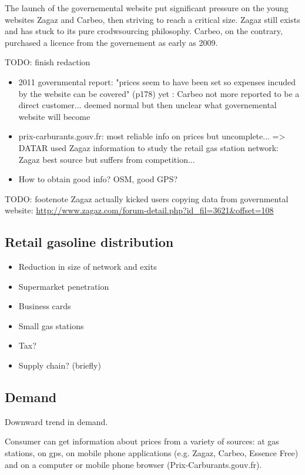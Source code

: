 \documentclass[11pt]{article}
\begin{document}
The launch of the governemental website put significant pressure on the young websites Zagaz and Carbeo, then striving to reach a critical size. Zagaz still exists and has stuck to its pure crodwsourcing philosophy. Carbeo, on the contrary, purchased a licence from the governement as early as 2009.

TODO: finish redaction
\begin{itemize}
\item 2011 governmental report: "prices seem to have been set so expenses incuded by the website can be covered" (p178) yet : Carbeo not more reported to be a direct customer... deemed normal but then unclear what governemental website will become
\item prix-carburants.gouv.fr: most reliable info on prices but uncomplete... => DATAR used Zagaz information to study the retail gas station network: Zagaz best source but suffers from competition...
\item How to obtain good info? OSM, good GPS?
\end{itemize}

TODO: footenote
Zagaz actually kicked users copying data from governmental website: \url{http://www.zagaz.com/forum-detail.php?id_fil=3621&offset=108}

\subsection{Retail gasoline distribution}
\begin{itemize}
\item Reduction in size of network and exits
\item Supermarket penetration
\item Business cards
\item Small gas stations
\item Tax?
\item Supply chain? (briefly)
\end{itemize}

\subsection{Demand}

Downward trend in demand.

Consumer can get information about prices from a variety of sources: at gas stations, on gps, on mobile phone applications (e.g. Zagaz, Carbeo, Essence Free) and on a computer or mobile phone browser (Prix-Carburants.gouv.fr).
\end{document}
